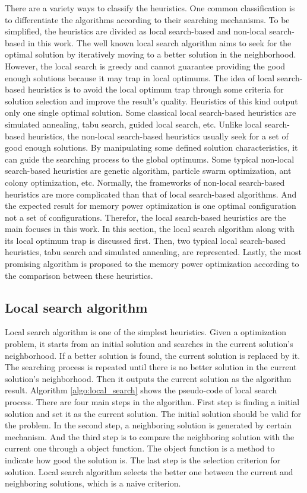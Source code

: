 	There are a variety ways to classify the heuristics. One common classification is to differentiate the algorithms
	according to their searching mechanisms. To be simplified, the heuristics are divided as local search-based and
	non-local search-based in this work. The well known local search algorithm aims to seek for the optimal solution by
	iteratively moving to a better solution in the neighborhood. However, the local search is greedy and cannot guarantee providing the good enough solutions because it may trap in local optimums. The idea of local search-based heuristics
	is to avoid the local optimum trap through some criteria for solution selection and improve the result's quality.
	Heuristics of this kind output only one single optimal solution. Some classical local search-based heuristics are simulated annealing, tabu search, guided local search, etc. Unlike local search-based heuristics, the non-local search-based heuristics usually seek for a set of good enough solutions. By manipulating some defined solution characteristics, it can guide the searching process to the global optimums. Some typical non-local search-based heuristics are genetic algorithm, particle swarm optimization, ant colony optimization, etc.
	Normally, the frameworks of non-local search-based heuristics are more complicated than that of local search-based algorithms. And the expected result for memory power optimization is one optimal configuration not a set of
	configurations. Therefor, the local search-based heuristics are the main focuses in this work.
	In this section, the local search algorithm along with its local optimum trap is discussed first. Then, two typical
	local search-based heuristics, tabu search and simulated annealing, are represented. Lastly, the most promising algorithm 
	is proposed to the memory power optimization according to the comparison between these heuristics.
	
		\subsection{Local search algorithm}
		\label{subsec:local_search}
		Local search algorithm is one of the simplest heuristics. Given a optimization problem, it starts from an initial solution and searches in the current solution's neighborhood. If a better solution is found, the current solution is replaced by it. The searching process is repeated until there is no better solution in the current solution's neighborhood. Then it outputs the current solution as the algorithm result.
		Algorithm \ref{algo:local_search} shows the pseudo-code of local search process. There are four main steps in the algorithm. First step is finding a initial solution and set it as the current solution. The initial solution should be valid for the problem. In the second step, a neighboring solution is generated by certain mechanism. And the third step is to compare the neighboring solution with the current one through a object function. The object function is a method to indicate how good the solution is. The last step is the selection criterion for solution. Local search algorithm selects the better one between the current and neighboring solutions, which is a naive criterion.
		
